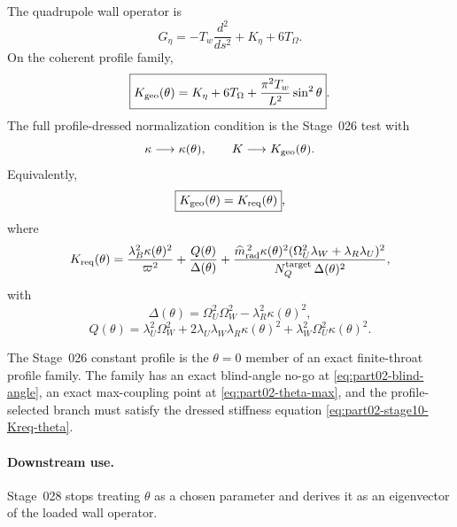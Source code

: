 The quadrupole wall operator is
\begin{equation}
G_\eta=-T_w\frac{d^2}{ds^2}+K_\eta+6T_\Omega.
\end{equation}
On the coherent profile family,
\begin{equation}
\label{eq:part02-Kgeo-theta}
\boxed{
K_{\rm geo}(\theta)
=K_\eta+6T_\Omega+\frac{\pi^2T_w}{L^2}\sin^2\theta}.
\end{equation}
The full profile-dressed normalization condition is the Stage~026 test with
\begin{equation}
\kappa\longrightarrow\kappa(\theta),
\qquad
K\longrightarrow K_{\rm geo}(\theta).
\end{equation}
Equivalently,
\begin{equation}
\label{eq:part02-stage10-Kreq-theta}
\boxed{
K_{\rm geo}(\theta)=K_{\rm req}(\theta)},
\end{equation}
where
\begin{equation}
\label{eq:part02-Kreq-theta}
K_{\rm req}(\theta)
=
\frac{\lambda_B^2\kappa(\theta)^2}{\varpi^2}
+
\frac{Q(\theta)}{\Delta(\theta)}
+
\frac{\widehat m_{\rm rad}^{\,2}\kappa(\theta)^2(\Omega_U^2\lambda_W+\lambda_R\lambda_U)^2}
{N_Q^{\rm target}\,\Delta(\theta)^2},
\end{equation}
with
\begin{equation}
\Delta(\theta)=\Omega_U^2\Omega_W^2-\lambda_R^2\kappa(\theta)^2,
\end{equation}
\begin{equation}
Q(\theta)=\lambda_U^2\Omega_W^2
+2\lambda_U\lambda_W\lambda_R\kappa(\theta)^2
+\lambda_W^2\Omega_U^2\kappa(\theta)^2.
\end{equation}

\begin{theorem}
\label{thm:part02-profile-selection-gate}
The Stage~026 constant profile is the \(\theta=0\) member of an exact finite-throat profile family.  The family has an exact blind-angle no-go at \eqref{eq:part02-blind-angle}, an exact max-coupling point at \eqref{eq:part02-theta-max}, and the profile-selected branch must satisfy the dressed stiffness equation \eqref{eq:part02-stage10-Kreq-theta}.
\end{theorem}

\paragraph{Downstream use.}
Stage~028 stops treating \(\theta\) as a chosen parameter and derives it as an eigenvector of the loaded wall operator.

